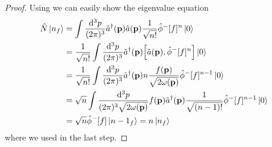 \qkgnumbereigenstate
\begin{proof}
	Using  we can easily show the eigenvalue equation
	\begin{equation*}
		\begin{split}
			\hat{N}
			\ket{n_f}
			&=
			\int\frac{\dd[3]{p}}{(2\pi)^3}
			\hat{a}^\dagger(\vb{p})
			\hat{a}(\vb{p})
			\frac{1}{\sqrt{n!}}
			\hat\phi^-[f]^n
			\ket{0}
			\\
			&=
			\frac{1}{\sqrt{n!}}
			\int\frac{\dd[3]{p}}{(2\pi)^3}
			\hat{a}^\dagger(\vb{p})
			\comm{\hat{a}(\vb{p})}{\hat\phi^-[f]^n}
			\ket{0}
			\\
			&=
			\frac{1}{\sqrt{n!}}
			\int\frac{\dd[3]{p}}{(2\pi)^3}
			\hat{a}^\dagger(\vb{p})
			n
			\frac{f(\vb{p})}{\sqrt{2\omega(\vb{p})}}
			\hat\phi^-[f]^{n-1}
			\ket{0}
			\\
			&=
			\sqrt{n}
			\int\frac{\dd[3]{p}}{(2\pi)^3\sqrt{2\omega(\vb{p})}}
				f(\vb{p})
			\hat{a}^\dagger(\vb{p})
			\frac{1}{\sqrt{(n-1)!}}
			\hat\phi^-[f]^{n-1}
			\ket{0}
			\\
			&=
			\sqrt{n}
			\hat\phi^-[f]
			\ket{n-1_f}
			=
			n
			\ket{n_f}
		\end{split}
	\end{equation*}
	where we used  in the last step.
\end{proof}


